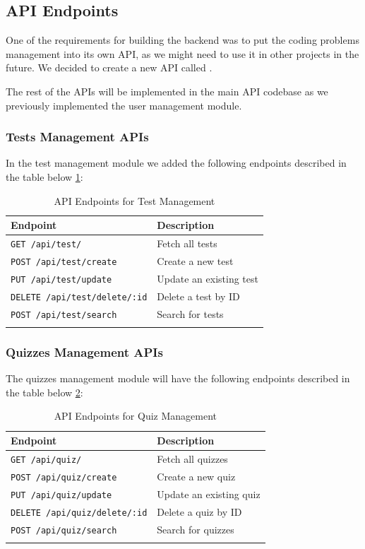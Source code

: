 \subsection{API Endpoints}
One of the requirements for building the backend was to put the coding problems management into
its own API, as we might need to use it in other projects in the future. We decided to create a new
API called .

The rest of the APIs will be implemented in the main API codebase as we previously implemented the user management
module.

\subsubsection{Tests Management APIs}
In the test management module we added the following endpoints described in the table below \ref{table:testEndpoints}:

\begin{longtable}{|>{\centering\arraybackslash}p{6cm}|>{\centering\arraybackslash}p{8cm}|}
  \hline
  \rowcolor{blue!20} \textbf{Endpoint} & \textbf{Description}    \\ \hline
  \texttt{GET /api/test/}              & Fetch all tests         \\ \hline
  \texttt{POST /api/test/create}       & Create a new test       \\ \hline
  \texttt{PUT /api/test/update}        & Update an existing test \\ \hline
  \texttt{DELETE /api/test/delete/:id} & Delete a test by ID     \\ \hline
  \texttt{POST /api/test/search}       & Search for tests        \\ \hline
  \caption{API Endpoints for Test Management} \label{table:testEndpoints}
\end{longtable}

\subsubsection{Quizzes Management APIs}
The quizzes management module will have the following endpoints described in the table below \ref{table:quizEndpoints}:

\begin{longtable}{|>{\centering\arraybackslash}p{6cm}|>{\centering\arraybackslash}p{8cm}|}
  \hline
  \rowcolor{blue!20} \textbf{Endpoint} & \textbf{Description}    \\ \hline
  \texttt{GET /api/quiz/}              & Fetch all quizzes       \\ \hline
  \texttt{POST /api/quiz/create}       & Create a new quiz       \\ \hline
  \texttt{PUT /api/quiz/update}        & Update an existing quiz \\ \hline
  \texttt{DELETE /api/quiz/delete/:id} & Delete a quiz by ID     \\ \hline
  \texttt{POST /api/quiz/search}       & Search for quizzes      \\ \hline
  \caption{API Endpoints for Quiz Management} \label{table:quizEndpoints}
\end{longtable}

